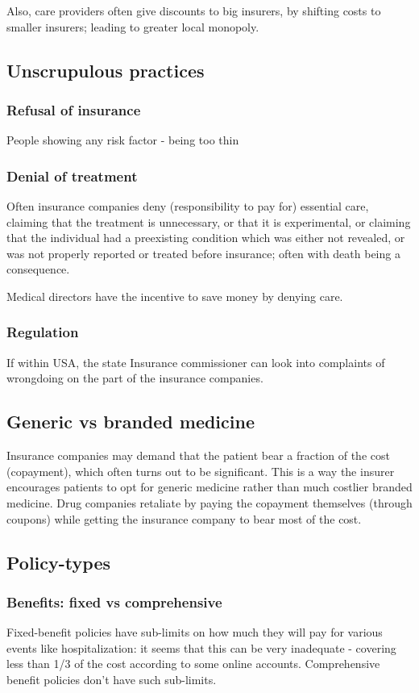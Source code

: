 \documentclass[oneside, article]{memoir}
\begin{document}
Also, care providers often give discounts to big insurers, by shifting costs to smaller insurers; leading to greater local monopoly.

\subsection{Unscrupulous practices}
\subsubsection{Refusal of insurance}
People showing any risk factor - being too thin

\subsubsection{Denial of treatment}
Often insurance companies deny (responsibility to pay for) essential care, claiming that the treatment is unnecessary, or that it is experimental, or claiming that the individual had a preexisting condition which was either not revealed, or was not properly reported or treated before insurance; often with death being a consequence.

Medical directors have the incentive to save money by denying care.

\subsubsection{Regulation}
If within USA, the state Insurance commissioner can look into complaints of wrongdoing on the part of the insurance companies.

\subsection{Generic vs branded medicine}
Insurance companies may demand that the patient bear a fraction of the cost (copayment), which often turns out to be significant. This is a way the insurer encourages patients to opt for generic medicine rather than much costlier branded medicine. Drug companies retaliate by paying the copayment themselves (through coupons) while getting the insurance company to bear most of the cost.

\subsection{Policy-types}
\subsubsection{Benefits: fixed vs comprehensive}
Fixed-benefit policies have sub-limits on how much they will pay for various events like hospitalization: it seems that this can be very inadequate - covering less than 1/3 of the cost according to some online accounts. Comprehensive benefit policies don't have such sub-limits.
\end{document}
